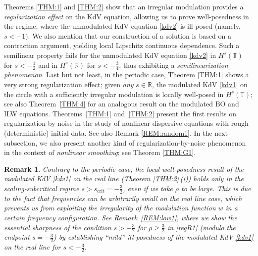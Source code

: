 \documentclass[letterpaper, 11pt,  reqno]{amsart}
\newtheorem{remark}[theorem]{Remark}
\newcommand{\1}{\hspace{0.5mm}\text{I}\hspace{0.5mm}}
\newcommand{\R}{\mathbb{R}}
\newcommand{\T}{\mathbb{T}}
\numberwithin{equation}{section}
\numberwithin{theorem}{section}
\begin{document}
Theorems \ref{THM:1} and \ref{THM:2}
show
that an irregular modulation provides a \emph{regularization effect} on the KdV equation, 
allowing us to prove well-posedness in the regime, where the unmodulated 
KdV equation \eqref{kdv2} is ill-posed
 (namely, $s < -1$).
We also mention that our construction of a solution is based on a contraction argument,
yielding local Lipschitz continuous dependence.
Such a semilinear property fails for 
 the unmodulated 
KdV equation \eqref{kdv2}
in $H^s(\T)$ for $s <  - \frac 12$
and in $H^{s}(\R)$ for $s <  -\frac 34$, 
thus exhibiting a {\it semilinearization phenomenon}.
Last but not least,  in the periodic case, 
Theorem \ref{THM:1} shows 
a very strong regularization effect;
given {\it any} $s \in \R$, 
the modulated KdV \eqref{kdv1}
on  the circle
with a sufficiently irregular modulation
is locally well-posed in $H^s(\T)$; see also Theorem~\ref{THM:4}
for an analogous result on the modulated BO and  ILW equations.
Theorems~\ref{THM:1} and~\ref{THM:2}
present  the first 
results 
on regularization by noise
in 
the study of nonlinear dispersive equations with rough (deterministic) initial data.
See also Remark \ref{REM:random1}.
In the next subsection, 
we also present another kind of regularization-by-noise phenomenon
in the context of 
{\it nonlinear smoothing};
see Theorem \ref{THM:G1}.




\begin{remark}\rm
Contrary to the periodic case, the local well-posedness result of the modulated KdV \eqref{kdv1}
on the real line 
(Theorem \ref{THM:2}\,(i)) holds only 
in the scaling-subcritical regime
$s > s_\text{crit} = -\frac 32$, even if we take $\rho$ to be large.
This is due to the fact that frequencies can be arbitrarily small on the real line case, 
which prevents us from 
exploiting the irregularity of the modulation function $w$
in a certain frequency configuration.
See Remark~\ref{REM:low1}, 
where we show
the essential sharpness of the condition $s > - \frac 32$ for $\rho \ge \frac 32$ in \eqref{regR1}
(modulo the endpoint $s = -\frac 32$)
by establishing ``mild'' ill-posedness
of the modulated KdV \eqref{kdv1} on the real line for $s < - \frac 32$.



\end{remark}
\end{document}
